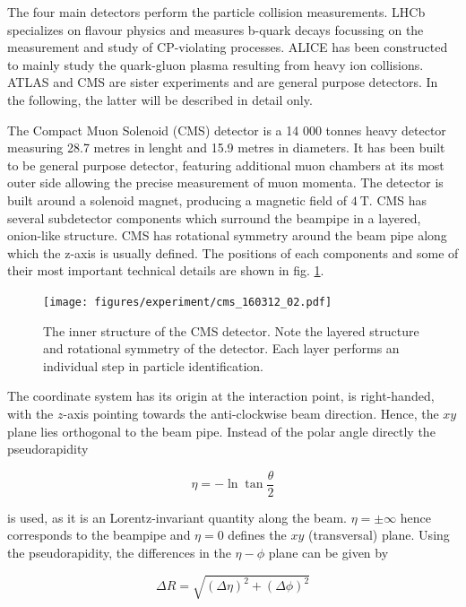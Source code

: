 The four main detectors perform the particle collision measurements. LHCb specializes on flavour physics and measures b-quark decays focussing on the measurement and study of CP-violating processes. ALICE has been constructed to mainly study the quark-gluon plasma resulting from heavy ion collisions. ATLAS and CMS are sister experiments and are general purpose detectors. In the following, the latter will be described in detail only.


The Compact Muon Solenoid (CMS) detector is a 14 000 tonnes heavy detector measuring 28.7 metres in lenght and 15.9 metres in diameters. It has been built to be general purpose detector, featuring additional muon chambers at its most outer side allowing the precise measurement of muon momenta. The detector is built around a solenoid magnet, producing a magnetic field of $\SI{4}{\tesla}$. CMS has several subdetector components which surround the beampipe in a layered, onion-like structure. CMS has rotational symmetry around the beam pipe along which the z-axis is usually defined. The positions of each components and some of their most important technical details are shown in fig. \ref{fig:cms_view}.

\begin{figure}[h!]
	\centering
	\texttt{[image: figures/experiment/cms\_160312\_02.pdf]}
	\caption{The inner structure of the CMS detector. Note the layered structure and rotational symmetry of the detector. Each layer performs an individual step in particle identification. \cite{Sakuma:2665537}}
	\label{fig:cms_view}
\end{figure}

The coordinate system has its origin at the interaction point, is right-handed, with the $z$-axis pointing towards the anti-clockwise beam direction. Hence, the $xy$ plane lies orthogonal to the beam pipe. Instead of the polar angle directly the pseudorapidity 

\begin{equation*}
	\eta = -\ln\tan\frac{\theta}{2}
\end{equation*}

is used, as it is an Lorentz-invariant quantity along the beam. $\eta = \pm\infty$ hence corresponds to the beampipe and $\eta = 0$ defines the $xy$ (transversal) plane. Using the pseudorapidity, the differences in the $\eta-\phi$ plane can be given by

\begin{equation*}
	\Delta R = \sqrt{\left(\Delta\eta\right)^2 + \left(\Delta\phi\right)^2}
\end{equation*}

